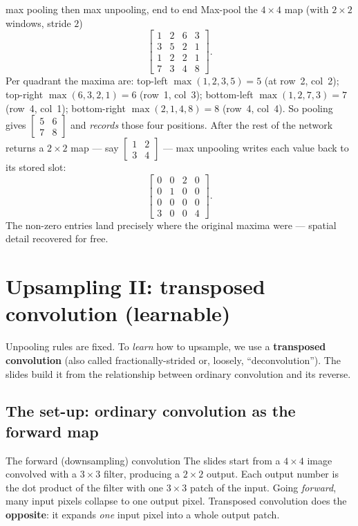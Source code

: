 \documentclass{report}
\begin{document}
\begin{exbox}{max pooling then max unpooling, end to end}
Max-pool the $4\times4$ map (with $2\times2$ windows, stride $2$)
\[
\begin{bmatrix}
1 & 2 & 6 & 3 \\
3 & 5 & 2 & 1 \\
1 & 2 & 2 & 1 \\
7 & 3 & 4 & 8
\end{bmatrix}.
\]
Per quadrant the maxima are: top-left $\max(1,2,3,5)=5$ (at row~2, col~2);
top-right $\max(6,3,2,1)=6$ (row~1, col~3); bottom-left $\max(1,2,7,3)=7$
(row~4, col~1); bottom-right $\max(2,1,4,8)=8$ (row~4, col~4). So pooling gives
$\begin{bmatrix}5&6\\7&8\end{bmatrix}$ and \emph{records} those four positions.
After the rest of the network returns a $2\times2$ map --- say
$\begin{bmatrix}1&2\\3&4\end{bmatrix}$ --- max unpooling writes each value back
to its stored slot:
\[
\begin{bmatrix}
0 & 0 & 2 & 0 \\
0 & 1 & 0 & 0 \\
0 & 0 & 0 & 0 \\
3 & 0 & 0 & 4
\end{bmatrix}.
\]
The non-zero entries land precisely where the original maxima were --- spatial
detail recovered for free.
\end{exbox}

\section{Upsampling II: transposed convolution (learnable)}

Unpooling rules are fixed. To \emph{learn} how to upsample, we use a
\textbf{transposed convolution} (also called fractionally-strided or, loosely,
``deconvolution''). The slides build it from the relationship between ordinary
convolution and its reverse.

\subsection{The set-up: ordinary convolution as the forward map}

\begin{defbox}{The forward (downsampling) convolution}
The slides start from a $4\times4$ image convolved with a $3\times3$ filter,
producing a $2\times2$ output. Each output number is the dot product of the
filter with one $3\times3$ patch of the input. Going \emph{forward}, many input
pixels collapse to one output pixel. Transposed convolution does the
\textbf{opposite}: it expands \emph{one} input pixel into a whole output patch.
\end{defbox}
\end{document}
